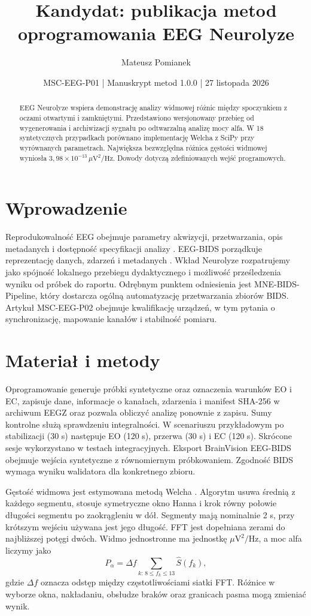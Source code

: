 \documentclass[11pt,a4paper]{article}
\title{Kandydat: publikacja metod oprogramowania EEG Neurolyze}
\author{Mateusz Pomianek}
\date{MSC-EEG-P01 | Manuskrypt metod 1.0.0 | 27 listopada 2026}
\begin{document}
\maketitle
\begin{abstract}
EEG Neurolyze wspiera demonstrację analizy widmowej różnic między spoczynkiem z oczami otwartymi i zamkniętymi. Przedstawiono wersjonowany przebieg od wygenerowania i archiwizacji sygnału po odtwarzalną analizę mocy alfa. W 18 syntetycznych przypadkach porównano implementację Welcha z SciPy przy wyrównanych parametrach. Największa bezwzględna różnica gęstości widmowej wyniosła $3{,}98\times10^{-13}\,\mu\mathrm{V}^2/\mathrm{Hz}$. Dowody dotyczą zdefiniowanych wejść programowych.
\end{abstract}
\section{Wprowadzenie}
Reprodukowalność EEG obejmuje parametry akwizycji, przetwarzania, opis metadanych i dostępność specyfikacji analizy \citep{pernet2020}. EEG-BIDS porządkuje reprezentację danych, zdarzeń i metadanych \citep{pernet2019}. Wkład Neurolyze rozpatrujemy jako spójność lokalnego przebiegu dydaktycznego i możliwość prześledzenia wyniku od próbek do raportu. Odrębnym punktem odniesienia jest MNE-BIDS-Pipeline, który dostarcza ogólną automatyzację przetwarzania zbiorów BIDS. Artykuł MSC-EEG-P02 obejmuje kwalifikację urządzeń, w tym pytania o synchronizację, mapowanie kanałów i stabilność pomiaru.

\section{Materiał i metody}
Oprogramowanie generuje próbki syntetyczne oraz oznaczenia warunków EO i EC, zapisuje dane, informacje o kanałach, zdarzenia i manifest SHA-256 w archiwum EEGZ oraz pozwala obliczyć analizę ponownie z zapisu. Sumy kontrolne służą sprawdzeniu integralności. W scenariuszu przykładowym po stabilizacji (30 s) następuje EO (120 s), przerwa (30 s) i EC (120 s). Skrócone sesje wykorzystano w testach integracyjnych. Eksport BrainVision EEG-BIDS obejmuje wejścia syntetyczne z równomiernym próbkowaniem. Zgodność BIDS wymaga wyniku walidatora dla konkretnego zbioru.

Gęstość widmowa jest estymowana metodą Welcha \citep{welch}. Algorytm usuwa średnią z każdego segmentu, stosuje symetryczne okno Hanna i krok równy połowie długości segmentu po zaokrągleniu w dół. Segmenty mają nominalnie 2 s, przy krótszym wejściu używana jest jego długość. FFT jest dopełniana zerami do najbliższej potęgi dwóch. Widmo jednostronne ma jednostkę $\mu\mathrm{V}^2/\mathrm{Hz}$, a moc alfa liczymy jako
\[
 P_\alpha=\Delta f\sum_{k:\,8\leq f_k\leq 13} \widehat S(f_k),
\]
gdzie $\Delta f$ oznacza odstęp między częstotliwościami siatki FFT. Różnice w wyborze okna, nakładaniu, obsłudze braków oraz granicach pasma mogą zmieniać wynik.
\end{document}
